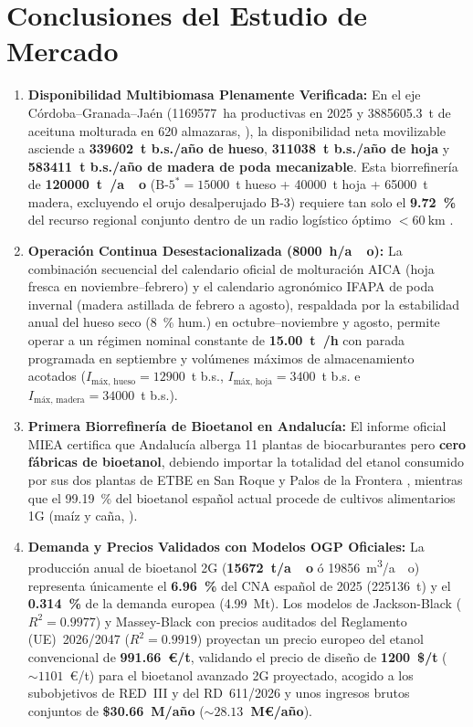 \documentclass{report}
\begin{document}
\chapter{Conclusiones del Estudio de Mercado}

\begin{enumerate}
    \item \textbf{Disponibilidad Multibiomasa Plenamente Verificada:} En el eje Córdoba--Granada--Jaén (\num{1169577}~ha productivas en 2025 y \num{3885605.3}~t de aceituna molturada en 620 almazaras, \textcite{MAPA2025, AICA2026}), la disponibilidad neta movilizable asciende a \textbf{\num{339602}~t b.s./año de hueso}, \textbf{\num{311038}~t b.s./año de hoja} y \textbf{\num{583411}~t b.s./año de madera de poda mecanizable}. Esta biorrefinería de \textbf{\SI{120000}{\tonne{}/ao}} ($\text{B-5}^* = \num{15000}$~t hueso + \num{40000}~t hoja + \num{65000}~t madera, excluyendo el orujo desalperujado B-3) requiere tan solo el \textbf{\SI{9.72}{\percent}} del recurso regional conjunto dentro de un radio logístico óptimo $< \SI{60}{\kilo\meter}$ \autocite{Ronda2027}.
    \item \textbf{Operación Continua Desestacionalizada (\SI{8000}{\hour/ao}):} La combinación secuencial del calendario oficial de molturación AICA (hoja fresca en noviembre--febrero) y el calendario agronómico IFAPA de poda invernal (madera astillada de febrero a agosto), respaldada por la estabilidad anual del hueso seco (\SI{8}{\percent} hum.) en octubre--noviembre y agosto, permite operar a un régimen nominal constante de \textbf{\SI{15.00}{\tonne{}/\hour}} con parada programada en septiembre y volúmenes máximos de almacenamiento acotados ($I_{\text{máx, hueso}} = \num{12900}$~t b.s., $I_{\text{máx, hoja}} = \num{3400}$~t b.s. e $I_{\text{máx, madera}} = \num{34000}$~t b.s.).
    \item \textbf{Primera Biorrefinería de Bioetanol en Andalucía:} El informe oficial MIEA certifica que Andalucía alberga 11 plantas de biocarburantes pero \textbf{cero fábricas de bioetanol}, debiendo importar la totalidad del etanol consumido por sus dos plantas de ETBE en San Roque y Palos de la Frontera \autocite[Sección~7, Nota~4]{AAE2026}, mientras que el \SI{99.19}{\percent} del bioetanol español actual procede de cultivos alimentarios 1G (maíz y caña, \textcite[Hoja~\texttt{Sost\_Tipo MP\_Bioet}]{MITECO2026}).
    \item \textbf{Demanda y Precios Validados con Modelos OGP Oficiales:} La producción anual de bioetanol 2G (\textbf{\SI{15672}{\tonne/ao}} ó \SI{19856}{\cubic\meter/ao}) representa únicamente el \textbf{\SI{6.96}{\percent}} del CNA español de 2025 (\num{225136}~t) y el \textbf{\SI{0.314}{\percent}} de la demanda europea (\num{4.99}~Mt). Los modelos de Jackson-Black ($R^2 = \num{0.9977}$) y Massey-Black con precios auditados del Reglamento (UE)~2026/2047 ($R^2 = \num{0.9919}$) proyectan un precio europeo del etanol convencional de \textbf{\num{991.66}~€/t}, validando el precio de diseño de \textbf{\num{1200}~\$/t} ($\sim \num{1101}$~€/t) para el bioetanol avanzado 2G proyectado, acogido a los subobjetivos de RED~III y del RD~611/2026 y unos ingresos brutos conjuntos de \textbf{\$\num{30.66}~M/año} (\textbf{$\sim \num{28.13}$~M€/año}).

\end{enumerate}
\end{document}
